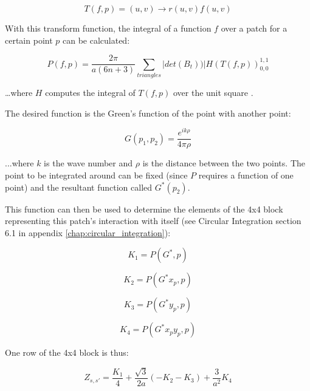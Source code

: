 \documentclass[etd,senior,noacknowledgments]{BYUPhys}
\begin{document}
\begin{equation}
  T\left(f,p\right)=\left(u,v\right)\rightarrow r\left(u,v\right)f\left(u,v\right)
\end{equation}

With this transform function, the integral of a function $f$ over a patch for a certain point $p$ can be calculated:

\begin{equation}
  P\left(f,p\right)=\frac{2\pi}{a\left(6n+3\right)}\sum_{triangles}|det\left(B_{t}\right))|H\left(T\left(f,p\right)\right)_{0,0}^{1,1}
\end{equation}

\ldots where $H$ computes the integral of $T\left(f,p\right)$ over the unit square \cite{HCubature}.

The desired function is the Green's function of the point with another point:

\begin{equation} \label{eq:greens}
  G\left(p_{1},p_{2}\right)=\frac{e^{ik\rho}}{4\pi\rho}
\end{equation}

...where $k$ is the wave number and $\rho$ is the distance between the two points. The point to be integrated around can be fixed (since $P$ requires a function of one point) and the resultant function called $G^{*}\left(p_{2}\right)$.

This function can then be used to determine the elements of the 4x4 block representing this patch's interaction with itself (see Circular Integration section 6.1 in appendix \ref{chap:circular_integration}):

\begin{equation}
  K_{1}=P\left(G^{*},p\right)
\end{equation}

\begin{equation}
  K_{2}=P\left(G^{*}x_{p},p\right)
\end{equation}

\begin{equation}
  K_{3}=P\left(G^{*}y_{p},p\right)
\end{equation}

\begin{equation}
  K_{4}=P\left(G^{*}x_{p}y_{p},p\right)
\end{equation}

One row of the 4x4 block is thus:

\begin{equation}
  Z_{s,s'}=\frac{K_{1}}{4}+\frac{\sqrt{3}}{2a}\left(-K_{2}-K_{3}\right)+\frac{3}{a^{2}}K_{4}
\end{equation}
\end{document}

